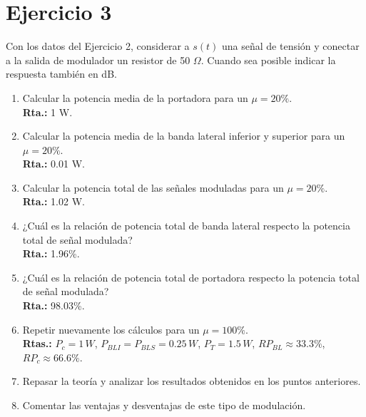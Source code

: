 \section{Ejercicio 3}

Con los datos del Ejercicio 2, considerar a $s(t)$ una señal de tensión y conectar a la salida de modulador un resistor de 50 $\Omega$. Cuando sea posible indicar la respuesta también en dB.

\begin{enumerate}[label=\alph*)]
    \item Calcular la potencia media de la portadora para un $\mu = 20\%$. \\
    \textbf{Rta.:} 1 W.
    \item Calcular la potencia media de la banda lateral inferior y superior para un $\mu = 20\%$. \\
    \textbf{Rta.:} 0.01 W.
    \item Calcular la potencia total de las señales moduladas para un $\mu = 20\%$. \\
    \textbf{Rta.:} 1.02 W.
    \item ¿Cuál es la relación de potencia total de banda lateral respecto la potencia total de señal modulada? \\
    \textbf{Rta.:} 1.96\%.
    \item ¿Cuál es la relación de potencia total de portadora respecto la potencia total de señal modulada? \\
    \textbf{Rta.:} 98.03\%.
    \item Repetir nuevamente los cálculos para un $\mu = 100\%$. \\
    \textbf{Rtas.:} $P_c = 1\,W$, $P_{BLI} = P_{BLS} = 0.25\,W$, $P_T = 1.5\,W$, $RP_{BL} \approx 33.3\%$, $RP_c \approx 66.6\%$.
    \item Repasar la teoría y analizar los resultados obtenidos en los puntos anteriores.
    \item Comentar las ventajas y desventajas de este tipo de modulación.
\end{enumerate}
